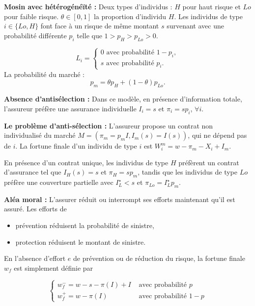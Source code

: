 \begin{f}
	
	\textbf{Mosin avec hétérogénéïté :} Deux types d'individus : $H$ pour haut risque et $Lo$ pour faible risque. $\theta \in[0,1]$ la proportion d'individu $H$. Les individus de type $i \in\{Lo, H\}$ font face à un risque de même montant $s$  survenant avec une probabilité différente $p_{i}$ telle que $1>p_{H}>p_{Lo}>0$.
	
	$$
	L_{i}=\left\{\begin{array}{l}
		0 \text { avec probabilité } 1-p_{i}, \\
		s \text { avec probabilité } p_{i} .
	\end{array}\right.
	$$
La probabilité du marché :
	$$
	p_{m}=\theta p_{H}+(1-\theta) p_{Lo} .
	$$
\medskip

\textbf{Absence d'antisélection :}  Dans ce modèle, en présence d'information totale, l'assureur préfère une assurance individuelle $I_{i}=s$ et $\pi_{i}=s p_{i}$, $\forall i$.

\textbf{ Le problème d'anti-sélection : }
L'assureur propose un  contrat non individualisé du marché $M=\left(\pi_{m}=p_{m} I, I_{m}(s)=I(s)\right)$, qui ne dépend pas de $i$. La fortune finale d'un individu de type $i$ est $W_{i}^{m}=w-\pi_{m}-X_{i}+I_{m}$.

En présence d'un contrat unique, les individus de type $H$ préfèrent un contrat d'assurance tel que $I_{H}(s)=s$  et $\pi_{H}=s p_{m}$, tandis que les individus de type $Lo$ préfère une couverture partielle avec $I_{L}^{\star}<s$ et $\pi_{Lo}=I_{L}^{\star} p_{m}$.
\medskip

\textbf{Aléa moral :}
L'assurer réduit ou interrompt ses efforts maintenant qu'il est assuré. Les efforts de
\begin{itemize}
	\item prévention réduisent la probabilité de sinistre,
	\item protection réduisent le montant de sinistre.
\end{itemize}

 En l'absence d'effort $e$ de prévention ou de réduction du risque, la fortune finale $w_{f}$ est simplement définie par

$$
\begin{cases}w_{f}^{-}=w-s-\pi(I)+I & \text { avec probabilité } p \\ w_{f}^{+}=w-\pi(I) & \text { avec probabilité } 1-p\end{cases}
$$


\end{f}

